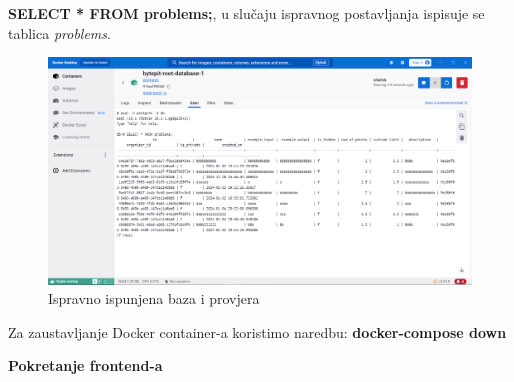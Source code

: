 				\textbf{SELECT * FROM problems;}, u slučaju ispravnog postavljanja ispisuje se tablica \textit{problems}.\\
				\begin{figure}[H]
					\includegraphics[scale=0.4]{slike/postgres.PNG} 
					\centering
					\caption{Ispravno ispunjena baza i provjera}
					\label{fig:docker_desktop_postgres}
				\end{figure}
				\noindent Za zaustavljanje Docker container-a koristimo naredbu: \textbf{docker-compose down}\\
				
			\eject
			
			\noindent\textbf{Pokretanje frontend-a}\\
			

